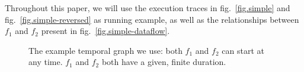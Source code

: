 \documentclass{article}
\begin{document}

    
Throughout this paper, we will use the execution traces in fig.~\ref{fig.simple} and fig.~\ref{fig.simple-reversed} as running example, as well as the relationships between $f_1$ and $f_2$ present in fig.~\ref{fig.simple-dataflow}. 
    
\begin{figure}[h]

\centering
\begin{tikzpicture}[]

\end{tikzpicture}
\caption{The example temporal graph we use: both $f_1$ and $f_2$ can start at any time. $f_1$ and $f_2$ both have a given, finite duration.}
\label{fig.tgraph}
\end{figure}
\end{document}
